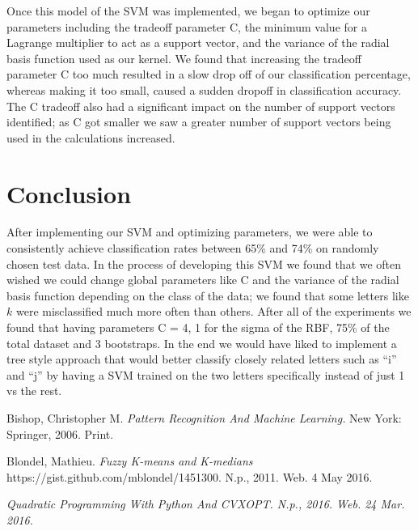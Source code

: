 \documentclass[journal]{IEEEtran}
\begin{document}
Once this model of the SVM was implemented, we began to optimize our parameters including the tradeoff parameter C, the minimum value for a Lagrange multiplier to act as a support vector, and the variance of the radial basis function used as our kernel. We found that increasing the tradeoff parameter C too much resulted in a slow drop off of our classification percentage, whereas making it too small, caused a sudden dropoff in classification accuracy. The C tradeoff also had a significant impact on the number of support vectors identified; as C got smaller we saw a greater number of support vectors being used in the calculations increased.\\

\section{Conclusion}
After implementing our SVM and optimizing parameters, we were able to consistently achieve classification rates between 65\% and 74\% on randomly chosen test data. In the process of developing this SVM we found that we often wished we could change global parameters like C and the variance of the radial basis function depending on the class of the data; we found that some letters like $k$ were misclassified much more often than others. After all of the experiments we found that having parameters C = 4, 1 for the sigma of the RBF, 75\% of the total dataset and 3 bootstraps. In the end we would have liked to implement a tree style approach that would better classify closely related letters such as “i” and “j” by having a SVM trained on the two letters specifically instead of just 1 vs the rest.


\ifCLASSOPTIONcaptionsoff
  \newpage
\fi

\begin{thebibliography}{1}

  Bishop, Christopher M. \emph{Pattern Recognition And Machine Learning.} New York: Springer, 2006. Print.

  Blondel, Mathieu. \emph{Fuzzy K-means and K-medians} https://gist.github.com/mblondel/1451300. N.p., 2011. Web. 4 May 2016.

  \emph{Quadratic Programming With Python And CVXOPT. N.p., 2016. Web. 24 Mar. 2016.}

\end{thebibliography}
\end{document}
